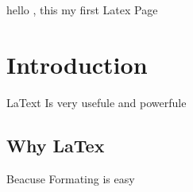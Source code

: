 \documentclass{article}
\begin{document}
	hello , this my first Latex Page
	
	\section{Introduction}
	LaText Is very usefule and powerfule
	
	\subsection{Why LaTex}
	Beacuse Formating is easy
\end{document}
